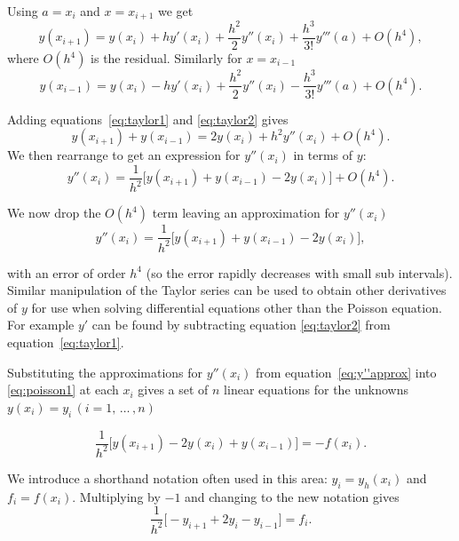 Using $a=x_{i}$ and $x=x_{i+1}$ we get
\begin{equation}
  y(x_{i+1})=y(x_{i})+hy'(x_{i})+\dfrac{h^{2}}{2}y''(x_{i})+\dfrac{h^{3}}{3!}y'''(a)+O(h^{4}),
  \label{eq:taylor1}
\end{equation}
where $O(h^{4})$ is the residual. Similarly for $x=x_{i-1}$
\begin{equation}
  y(x_{i-1})=y(x_{i})-hy'(x_{i})+\dfrac{h^{2}}{2}y''(x_{i})-\dfrac{h^{3}}{3!}y'''(a)+O(h^{4}).
  \label{eq:taylor2}
\end{equation}

Adding equations~\eqref{eq:taylor1} and \eqref{eq:taylor2} gives
\begin{equation*}
  y(x_{i+1})+y(x_{i-1})=2y(x_{i})+h^{2}y''(x_{i})+O(h^{4}).
\end{equation*}
We then rearrange to get an expression for $y''(x_{i})$ in terms of $y$:
\begin{equation*}
  y''(x_{i})=\dfrac{1}{h^{2}}\Big[y(x_{i+1})+y(x_{i-1})-2y(x_{i})\Big]+O(h^{4}).
\end{equation*}

We now drop the $O(h^{4})$ term leaving an approximation for $y''(x_{i})$
\begin{equation}
  y''(x_{i})=\dfrac{1}{h^{2}}\Big[y(x_{i+1})+y(x_{i-1})-2y(x_{i})\Big],
  \label{eq:y''approx}
\end{equation}

with an error of order $h^{4}$ (so the error rapidly decreases with small
sub intervals). Similar manipulation of the Taylor series can be used to obtain
other derivatives of $y$ for use when solving differential equations other than
the Poisson equation. For example $y'$ can be found by subtracting equation
\eqref{eq:taylor2} from equation~\eqref{eq:taylor1}.

Substituting the approximations for $y''(x_{i})$ from equation~\eqref{eq:y''approx}
into \eqref{eq:poisson1} at each $x_{i}$ gives a set of $n$ linear
equations for the unknowns $y(x_i) = y_i \, (i=1 , \, \ldots \, , n)$

\begin{equation*}
  \dfrac{1}{h^{2}}\Big[y(x_{i+1})-2y(x_{i})+y(x_{i-1})\Big]=-f(x_{i}).
\end{equation*}

We introduce a shorthand notation often used in this area: $y_{i}=y_{h}(x_{i})$
and $f_{i}=f(x_{i})$. Multiplying by $-1$ and changing to the new
notation gives
\begin{equation}
  \dfrac{1}{h^{2}}\Big[-y_{i+1}+2y_{i}-y_{i-1}\Big]=f_{i}.
  \label{eq:23}
\end{equation}

